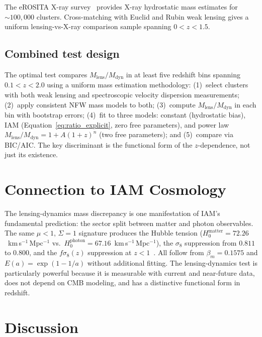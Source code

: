 \documentclass[12pt,a4paper]{article}
\begin{document}
The eROSITA X-ray survey~\citep{Merloni2012} provides X-ray hydrostatic mass
estimates for $\sim 100{,}000$ clusters. Cross-matching with Euclid and Rubin
weak lensing gives a uniform lensing-vs-X-ray comparison sample spanning
$0 < z < 1.5$.

\subsection{Combined test design}

The optimal test compares $M_\mathrm{lens}/M_\mathrm{dyn}$ in at least five
redshift bins spanning $0.1 < z < 2.0$ using a uniform mass estimation
methodology: (1)~select clusters with both weak lensing and spectroscopic
velocity dispersion measurements; (2)~apply consistent NFW mass models to both;
(3)~compute $M_\mathrm{lens}/M_\mathrm{dyn}$ in each bin with bootstrap errors;
(4)~fit to three models: constant (hydrostatic bias), IAM
(Equation~\ref{eq:ratio_explicit}, zero free parameters), and power law
$M_\mathrm{lens}/M_\mathrm{dyn} = 1 + A(1+z)^n$ (two free parameters); and
(5)~compare via BIC/AIC. The key discriminant is the functional form of the
$z$-dependence, not just its existence.

\section{Connection to IAM Cosmology}

The lensing-dynamics mass discrepancy is one manifestation of IAM's fundamental
prediction: the sector split between matter and photon observables. The same
$\mu < 1$, $\Sigma = 1$ signature produces the Hubble tension
($H_0^\mathrm{matter} = 72.26$~km\,s$^{-1}$\,Mpc$^{-1}$ vs.\ $H_0^\mathrm{photon}
= 67.16$~km\,s$^{-1}$\,Mpc$^{-1}$), the $\sigma_8$ suppression from $0.811$ to
$0.800$, and the $f\sigma_8(z)$ suppression at $z < 1$~\citep{Mahaffey2026a}.
All follow from $\beta_m = 0.1575$ and $E(a) = \exp(1-1/a)$ without additional
fitting. The lensing-dynamics test is particularly powerful because it is
measurable with current and near-future data, does not depend on CMB modeling,
and has a distinctive functional form in redshift.

\section{Discussion}
\end{document}
